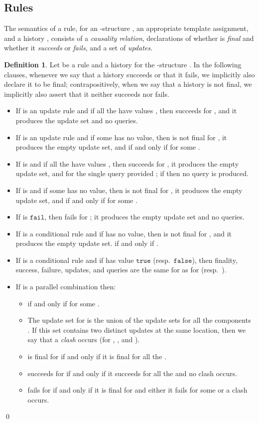 \documentclass{LMCS}
\theoremstyle{definition}
\newtheorem{df}[thm]{Definition}
\newenvironment{ls}{\begin{itemize}}{\end{itemize}}
\newcommand{\ttt}[1]{\ensuremath{\mathtt {#1}}}
\begin{document}
\subsection{Rules}

The semantics of a rule, for an -structure , an appropriate
template assignment, and a history , consists of a \emph{causality
relation}, declarations of whether  is \emph{final} and whether it
\emph{succeeds} or \emph{fails}, and a set of \emph{updates}.

\begin{df}
  Let  be a rule and  a history for the -structure .  In the
  following clauses, whenever we say that a history succeeds or that
  it fails, we implicitly also declare it to be final;
  contrapositively, when we say that a history is not final, we
  implicitly also assert that it neither succeeds nor fails.
  \begin{ls}
    \item If  is an update rule  and if all
    the  have values , then  succeeds for
    , and it produces the update set
     and no queries.
    \item If  is an update rule  and if some
     has no value, then  is not final for , it produces
    the empty update set, and  if and only if
     for some .
  \item If  is  and if all the 
  have values , then  succeeds for , it
  produces the empty update set, and  for the single
  query  provided ; if
   then no query is produced.
    \item If  is  and if some 
    has no value, then  is not final for , it produces the
    empty update set, and  if and only if
     for some .
  \item If  is \ttt{fail}, then  fails for
    ; it produces the empty update set and no queries.
    \item If  is a conditional rule  and if  has no value, then
 is not final for , and it produces the empty update set.
 if and only if .
     \item If  is a conditional rule  and if  has
value \ttt{true} (resp.\ \ttt{false}), then finality, success, failure,
updates, and queries are the same for  as for  (resp.\ ).
     \item If  is a parallel combination  then:
       \begin{ls}
     \item  if and only if 
     for some .
     \item The update set for  is the union of the update sets
     for all the components .  If this set contains two
     distinct updates at the same location, then we say that a
     \emph {clash} occurs (for , , and ).
     \item  is final for  if and only if it is final for
     all the .
     \item  succeeds for  if and only if it succeeds for
         all the  and no clash occurs.
     \item  fails for  if and only if it is final for 
     and either it fails for some  or a clash occurs.
       \end{ls}
  \end{ls}
\qed\end{df}
\end{document}
